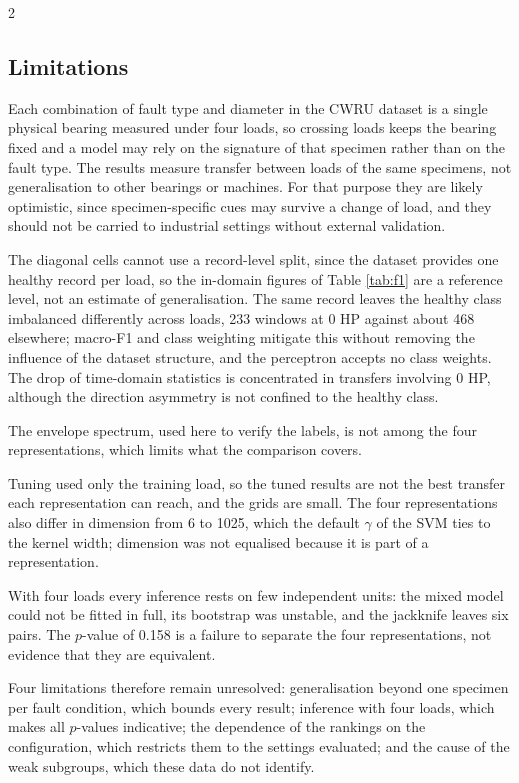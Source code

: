 \documentclass[12pt,twoside,titlepage]{ingenius}
\begin{document}
\begin{multicols}{2}
\subsection{Limitations}

Each combination of fault type and diameter in the CWRU dataset is a single
physical bearing measured under four loads, so crossing loads keeps the bearing
fixed and a model may rely on the signature of that specimen rather than on the
fault type. The results measure transfer between loads of the same specimens,
not generalisation to other bearings or machines. For that purpose they are
likely optimistic, since specimen-specific cues may survive a change of load, and
they should not be carried to industrial settings without external validation.

The diagonal cells cannot use a record-level split, since the dataset provides
one healthy record per load, so the in-domain figures of Table \ref{tab:f1} are
a reference level, not an estimate of generalisation. The same record leaves
the healthy class imbalanced differently across loads, 233 windows at 0 HP
against about 468 elsewhere; macro-F1 and class weighting mitigate this without
removing the influence of the dataset structure, and the perceptron accepts no
class weights. The drop of time-domain statistics is
concentrated in transfers involving 0 HP, although the direction asymmetry is not confined to the healthy class.

The envelope spectrum, used here to verify the labels, is not among the four representations, which limits
what the comparison covers.

Tuning used only the training load, so the tuned results are not the best
transfer each representation can reach, and the grids are small. The four
representations also differ in dimension from 6 to 1025, which the default
$\gamma$ of the SVM ties to the kernel width; dimension was not equalised
because it is part of a representation.

With four loads every inference rests on few independent units: the mixed model
could not be fitted in full, its bootstrap was unstable, and the jackknife
leaves six pairs. The $p$-value of 0.158 is a failure to separate the four
representations, not evidence that they are equivalent.

Four limitations therefore remain unresolved: generalisation beyond one
specimen per fault condition, which bounds every result; inference with four
loads, which makes all $p$-values indicative; the dependence of the rankings on
the configuration, which restricts them to the settings evaluated; and the cause
of the weak subgroups, which these data do not identify.


\end{multicols}
\end{document}
